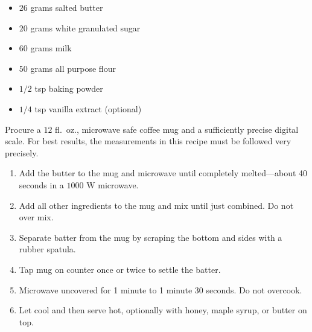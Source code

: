 
\RequirePackage{../recipe}






\thispagestyle{firstpage}

\ingredients
\begin{itemize}
    \item $26$ grams salted butter
    \item $20$ grams white granulated sugar
    \item $60$ grams milk
    \item $50$ grams all purpose flour
    \item $1/2$ tsp baking powder
    \item $1/4$ tsp vanilla extract (optional)
\end{itemize}

\instructions
Procure a $12$ fl.\ oz., microwave safe coffee mug and a sufficiently precise digital scale. For best results, the measurements in this recipe must be followed very precisely.
\begin{enumerate}
    \item Add the butter to the mug and microwave until completely melted---about 40 seconds in a $1000$ W microwave.
    \item Add all other ingredients to the mug and mix until just combined. Do not over mix.
    \item Separate batter from the mug by scraping the bottom and sides with a rubber spatula.
    \item Tap mug on counter once or twice to settle the batter.
    \item Microwave uncovered for 1 minute to 1 minute 30 seconds. Do not overcook.
    \item Let cool and then serve hot, optionally with honey, maple syrup, or butter on top.
\end{enumerate}

\spewfootnotes


